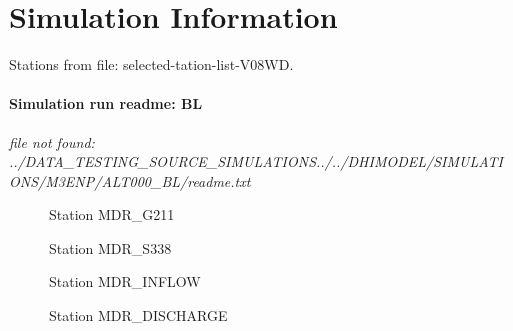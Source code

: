 

\section{Simulation Information}

Stations from file: selected-tation-list-V08WD.

\paragraph{Simulation run readme: BL}
\vskip 0.1in \emph{file not found: ../DATA_TESTING\TESTING_SOURCE_SIMULATIONS../../DHIMODEL/SIMULATIONS/M3ENP/ALT000_BL/readme.txt}

\clearpage
\begin{figure}[!H] \begin{center}
 \caption[Station MDR\_G211]{Station MDR\_G211}
\label{fig:MDR_G211all}
 \end{center}
 \end{figure}
\clearpage
\begin{figure}[!H] \begin{center}
 \caption[Station MDR\_S338]{Station MDR\_S338}
\label{fig:MDR_S338all}
 \end{center}
 \end{figure}
\clearpage
\begin{figure}[!H] \begin{center}
 \caption[Station MDR\_INFLOW]{Station MDR\_INFLOW}
\label{fig:MDR_INFLOWall}
 \end{center}
 \end{figure}
\clearpage
\begin{figure}[!H] \begin{center}
 \caption[Station MDR\_DISCHARGE]{Station MDR\_DISCHARGE}
\label{fig:MDR_DISCHARGEall}
 \end{center}
 \end{figure}

